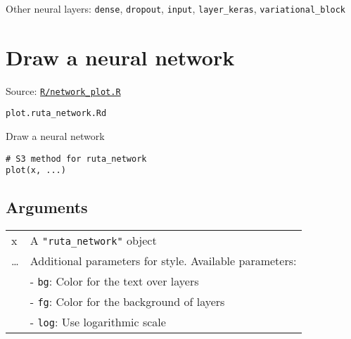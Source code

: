 Other neural layers: \texttt{dense}, \texttt{dropout}, \texttt{input},
\texttt{layer\_keras}, \texttt{variational\_block}

\section{Draw a neural network}\label{draw-a-neural-network}

Source:
\href{https://github.com/fdavidcl/ruta/blob/master/R/network_plot.R}{\texttt{R/network\_plot.R}}

\texttt{plot.ruta\_network.Rd}

Draw a neural network

\begin{verbatim}
# S3 method for ruta_network
plot(x, ...)
\end{verbatim}

\hypertarget{arguments}{\subsection{\texorpdfstring{\protect\hyperlink{arguments}{}Arguments}{Arguments}}\label{arguments}}

\begin{longtable}[c]{@{}ll@{}}
\toprule
\begin{minipage}[t]{0.08\columnwidth}\raggedright\strut
x
\strut\end{minipage} &
\begin{minipage}[t]{0.73\columnwidth}\raggedright\strut
A \texttt{"ruta\_network"} object
\strut\end{minipage}\tabularnewline
\begin{minipage}[t]{0.08\columnwidth}\raggedright\strut
\ldots{}
\strut\end{minipage} &
\begin{minipage}[t]{0.73\columnwidth}\raggedright\strut
Additional parameters for style. Available parameters:
\strut\end{minipage}\tabularnewline
\begin{minipage}[t]{0.08\columnwidth}\raggedright\strut
\strut\end{minipage} &
\begin{minipage}[t]{0.73\columnwidth}\raggedright\strut
- \texttt{bg}: Color for the text over layers
\strut\end{minipage}\tabularnewline
\begin{minipage}[t]{0.08\columnwidth}\raggedright\strut
\strut\end{minipage} &
\begin{minipage}[t]{0.73\columnwidth}\raggedright\strut
- \texttt{fg}: Color for the background of layers
\strut\end{minipage}\tabularnewline
\begin{minipage}[t]{0.08\columnwidth}\raggedright\strut
\strut\end{minipage} &
\begin{minipage}[t]{0.73\columnwidth}\raggedright\strut
- \texttt{log}: Use logarithmic scale
\strut\end{minipage}\tabularnewline
\bottomrule
\end{longtable}

